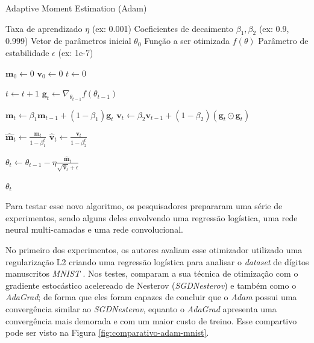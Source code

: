 \begin{algorithm}[H]
    \caption{Adaptive Moment Estimation (Adam)}
    \label{alg:adam}
    \begin{algorithmic}[1]

    \Require Taxa de aprendizado $\eta$ (ex: 0.001)
    \Require Coeficientes de decaimento $\beta_1, \beta_2$ (ex: 0.9, 0.999)
    \Require Vetor de parâmetros inicial $\theta_0$
    \Require Função a ser otimizada $f(\theta)$
    \Require Parâmetro de estabilidade $\epsilon$ (ex: 1e-7)

    \State $\mathbf{m}_0 \leftarrow 0$ 
    \State $\mathbf{v}_0 \leftarrow 0$ 
    \State $t \leftarrow 0$ 

        \State $t \leftarrow t + 1$
        \State $\mathbf{g}_t \leftarrow \nabla_{\theta_{t-1}} f(\theta_{t-1})$
        
        \State $\mathbf{m}_t \leftarrow \beta_1 \mathbf{m}_{t-1} + (1 - \beta_1) \mathbf{g}_t$
        \State $\mathbf{v}_t \leftarrow \beta_2 \mathbf{v}_{t-1} + (1 - \beta_2) (\mathbf{g}_t \odot \mathbf{g}_t)$
        
        \State $\mathbf{\hat{m}}_t \leftarrow \frac{\mathbf{m}_t}{1 - \beta_1^t}$
        \State $\mathbf{\hat{v}}_t \leftarrow \frac{\mathbf{v}_t}{1 - \beta_2^t}$
        
        \State $\theta_t \leftarrow \theta_{t-1} - \eta  \frac{\mathbf{\hat{m}}_t}{\sqrt{\mathbf{\hat{v}}_t} + \epsilon}$
    \EndWhile

    \State \Return $\theta_t$ 
    \end{algorithmic}
\end{algorithm}

Para testar esse novo algoritmo, os pesquisadores \textcite{AdamMethod} prepararam uma série de experimentos, sendo alguns deles envolvendo uma regressão logística, uma rede neural multi-camadas e uma rede convolucional.

No primeiro dos experimentos, os autores avaliam esse otimizador utilizado uma regularização L2 criando uma regressão logística para analisar o \textit{dataset} de dígitos manuscritos \textit{MNIST} \parencite{AdamMethod}. Nos testes, \textcite{AdamMethod} comparam a sua técnica de otimização com o gradiente estocástico acelereado de Nesterov (\textit{SGDNesterov}) e também como o \textit{AdaGrad}; de forma que eles foram capazes de concluir que o \textit{Adam} possui uma convergência similar ao \textit{SGDNesterov}, equanto o \textit{AdaGrad} apresenta uma convergência mais demorada e com um maior custo de treino. Esse compartivo pode ser visto na Figura \ref{fig:comparativo-adam-mnist}.

